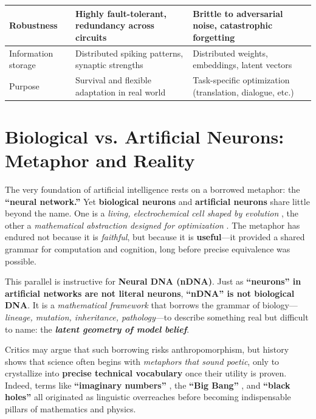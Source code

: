 \documentclass[11pt]{article}
\begin{document}
\begin{table}[ht!]
\begin{tabularx}{\textwidth}{|>{\raggedright\arraybackslash}p{}|
                                >{\raggedright\arraybackslash}X|
                                >{\raggedright\arraybackslash}X|}
\hline
Robustness & Highly fault-tolerant, redundancy across circuits & Brittle to adversarial noise, catastrophic forgetting \\
\hline
Information storage & Distributed spiking patterns, synaptic strengths & Distributed weights, embeddings, latent vectors \\
\hline
Purpose & Survival and flexible adaptation in real world & Task-specific optimization (translation, dialogue, etc.) \\
\hline
\end{tabularx}
\end{table}




\section{Biological vs. Artificial Neurons: Metaphor and Reality}

The very foundation of artificial intelligence rests on a borrowed metaphor: the \textbf{``neural network.''} 
Yet \textbf{biological neurons} and \textbf{artificial neurons} share little beyond the name. 
One is a \emph{living, electrochemical cell shaped by evolution} \cite{Kandel1991PrinciplesNeuralScience}, 
the other a \emph{mathematical abstraction designed for optimization} \cite{McCullochPitts1943LogicalCalculus}. 
The metaphor has endured not because it is \emph{faithful}, but because it is \textbf{useful}---it provided a shared grammar for computation and cognition, long before precise equivalence was possible. 

This parallel is instructive for \textbf{Neural DNA (nDNA)}. 
Just as \textbf{``neurons'' in artificial networks are not literal neurons}, \textbf{``nDNA'' is not biological DNA}. 
It is a \emph{mathematical framework} that borrows the grammar of biology---\textit{lineage, mutation, inheritance, pathology}---to describe something real but difficult to name: the \textbf{\emph{latent geometry of model belief}}. 

Critics may argue that such borrowing risks anthropomorphism, but history shows that science often begins with \emph{metaphors that sound poetic}, only to crystallize into \textbf{precise technical vocabulary} once their utility is proven. 
Indeed, terms like \textbf{``imaginary numbers''} \cite{Mazur1998ImaginaryNumbers}, 
the \textbf{``Big Bang''} \cite{Kragh1996CosmologyControversy}, 
and \textbf{``black holes''} \cite{Penrose2004RoadToReality} 
all originated as linguistic overreaches before becoming indispensable pillars of mathematics and physics. 
\end{document}
